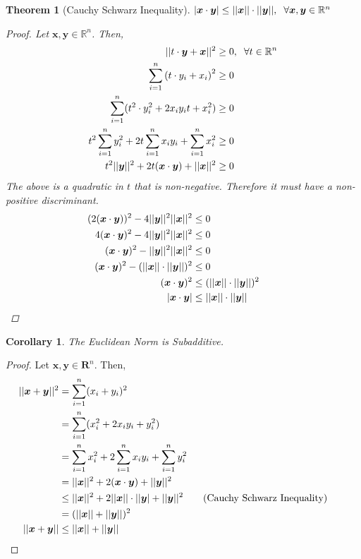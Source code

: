 \documentclass{article}
\newtheorem{theorem}{Theorem}[section]
\newtheorem{corollary}{Corollary}[theorem]
\begin{document}
			\begin{theorem}[Cauchy Schwarz Inequality]
			\label{cauchy-schwarz}
				$|\bm{x}\cdot\bm{y}| \leq ||\bm{x}||\cdot||\bm{y}||, \hspace{2 mm} \forall \bm{x}, \bm{y} \in \mathbb{R}^n$
			\begin{proof}
				Let $\bm{x}, \bm{y} \in \mathbb{R}^n$. Then,
				\begin{align*}
					||t \cdot \bm{y} + \bm{x}||^2 &\geq 0, \hspace{2 mm} \forall t \in \mathbb{R}^n\\
					\sum\limits_{i=1}^n {(t \cdot y_i + x_i)}^2 &\geq 0\\
					\sum\limits_{i=1}^n (t^2 \cdot y_i^2 + 2x_i y_i t+x_i^2) &\geq 0\\
					t^2 \sum\limits_{i=1}^n y_i^2 + 2t \sum\limits_{i=1}^n x_i y_i + \sum\limits_{i=1}^n x_i^2 &\geq 0\\
					t^2 ||\bm{y}||^2 + 2t (\bm{x}\cdot\bm{y}) + ||\bm{x}||^2 &\geq 0\\
				\end{align*}
				The above is a quadratic in $t$ that is non-negative. Therefore it must have a non-positive discriminant.
				\begin{align*}
					(2(\bm{x}\cdot\bm{y}))^2 - 4||\bm{y}||^2 ||\bm{x}||^2 &\leq 0\\
					4(\bm{x}\cdot\bm{y})^2 - 4||\bm{y}||^2 ||\bm{x}||^2 &\leq 0\\
					(\bm{x}\cdot\bm{y})^2 - ||\bm{y}||^2 ||\bm{x}||^2 &\leq 0\\
					(\bm{x}\cdot\bm{y})^2 - (||\bm{x}|| \cdot ||\bm{y}||)^2 &\leq 0\\
					(\bm{x}\cdot\bm{y})^2 &\leq (||\bm{x}|| \cdot ||\bm{y}||)^2\\
					|\bm{x}\cdot\bm{y}| &\leq ||\bm{x}|| \cdot ||\bm{y}|| &&\qedhere
				\end{align*}
			\end{proof}
			\end{theorem}

			\begin{corollary}
				The Euclidean Norm is Subadditive.
			\end{corollary}
			\begin{proof}
				Let $\bm{x}, \bm{y} \in \mathbf{R}^n$. Then,
				\begin{align*}
					||\bm{x} + \bm{y}||^2 &= \sum\limits_{i=1}^n (x_i + y_i)^2\\
										  &= \sum\limits_{i=1}^n (x_i^2 + 2x_i y_i + y_i^2)\\
										  &= \sum\limits_{i=1}^n x_i^2 + 2 \sum\limits_{i=1}^n x_i y_i + \sum\limits_{i=1}^n y_i^2\\
										  &= ||\bm{x}||^2 + 2 (\bm{x} \cdot \bm{y}) + ||\bm{y}||^2\\
										  &\leq ||\bm{x}||^2 + 2 ||\bm{x}|| \cdot ||\bm{y}| + ||\bm{y}||^2 \tag{Cauchy Schwarz Inequality}\\
										  &= (||\bm{x}|| + ||\bm{y}||)^2\\
					  ||\bm{x} + \bm{y}|| &\leq ||\bm{x}|| + ||\bm{y}|| &&\qedhere
				\end{align*}
				
			\end{proof}
\end{document}
